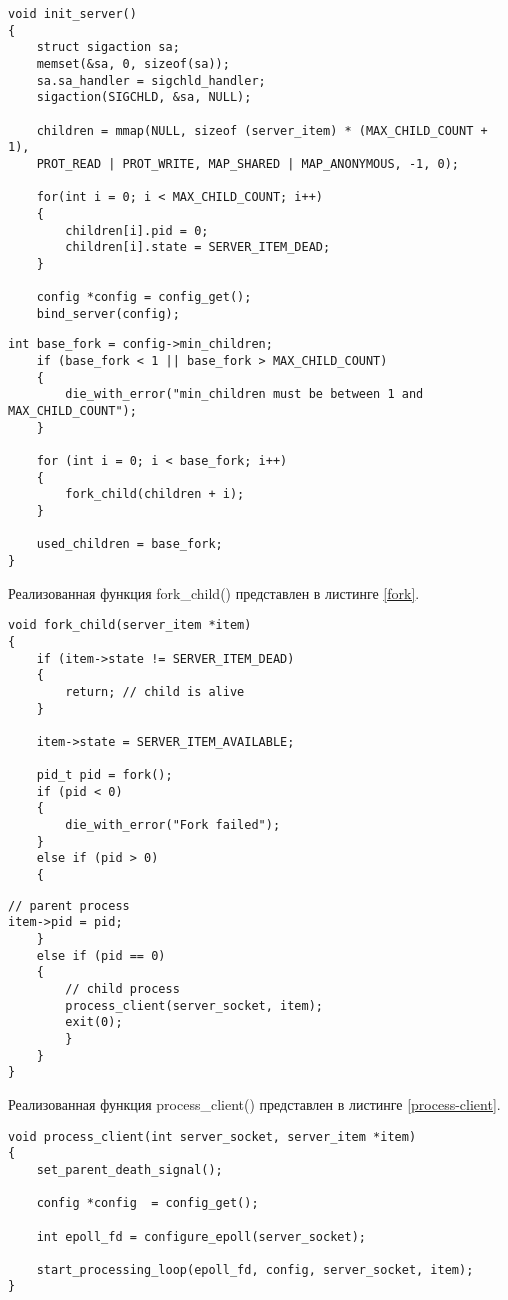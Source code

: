 \begin{lstlisting}[caption={Реализация функции init\_server()}, label=init]
void init_server()
{
	struct sigaction sa;
	memset(&sa, 0, sizeof(sa));
	sa.sa_handler = sigchld_handler;
	sigaction(SIGCHLD, &sa, NULL);
	
	children = mmap(NULL, sizeof (server_item) * (MAX_CHILD_COUNT + 1),
	PROT_READ | PROT_WRITE, MAP_SHARED | MAP_ANONYMOUS, -1, 0);
	
	for(int i = 0; i < MAX_CHILD_COUNT; i++)
	{
		children[i].pid = 0;
		children[i].state = SERVER_ITEM_DEAD;
	}
	
	config *config = config_get();
	bind_server(config);
\end{lstlisting}

\begin{lstlisting}[title={Окончание листинга \ref{init}}, label=init1, firstnumber=19]
	int base_fork = config->min_children;
	if (base_fork < 1 || base_fork > MAX_CHILD_COUNT)
	{
		die_with_error("min_children must be between 1 and MAX_CHILD_COUNT");
	}

	for (int i = 0; i < base_fork; i++)
	{
		fork_child(children + i);
	}

	used_children = base_fork;
}
\end{lstlisting}

Реализованная функция fork\_child() представлен в листинге \ref{fork}.

\begin{lstlisting}[caption={Реализация функции init\_server()}, label=fork]
void fork_child(server_item *item)
{
	if (item->state != SERVER_ITEM_DEAD)
	{
		return; // child is alive
	}
	
	item->state = SERVER_ITEM_AVAILABLE;
	
	pid_t pid = fork();
	if (pid < 0)
	{
		die_with_error("Fork failed");
	}
	else if (pid > 0)
	{
\end{lstlisting}

\begin{lstlisting}[title={Окончание листинга \ref{fork}}, label=fork1, firstnumber=17]
// parent process
item->pid = pid;
	}
	else if (pid == 0)
	{
		// child process
		process_client(server_socket, item);
		exit(0);
		}
	}
}
\end{lstlisting}

Реализованная функция process\_client() представлен в листинге \ref{process-client}.

\begin{lstlisting}[caption={Реализация функции process\_client()}, label=process-client]
void process_client(int server_socket, server_item *item)
{
	set_parent_death_signal();
	
	config *config  = config_get();
	
	int epoll_fd = configure_epoll(server_socket);
	
	start_processing_loop(epoll_fd, config, server_socket, item);
}
\end{lstlisting}

